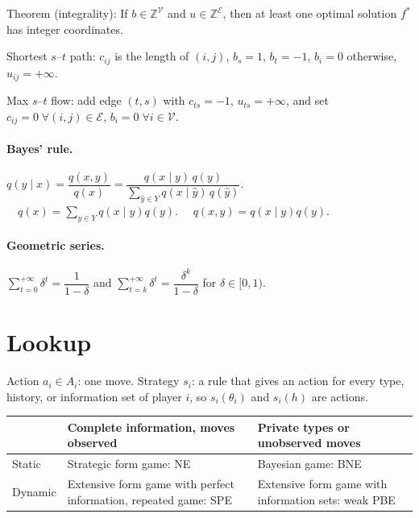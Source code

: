 \documentclass{article}
\begin{document}
Theorem (integrality): If $b\in\mathbb Z^{\mathcal V}$ and $u\in\mathbb Z^{\mathcal E}$, then at least one optimal solution $f^*$ has integer coordinates.

Shortest $s$--$t$ path: $c_{ij}$ is the length of $(i,j)$, $b_s=1$, $b_t=-1$, $b_i=0$ otherwise, $u_{ij}=+\infty$.

Max $s$--$t$ flow: add edge $(t,s)$ with $c_{ts}=-1$, $u_{ts}=+\infty$, and set $c_{ij}=0\;\forall(i,j)\in\mathcal E$, $b_i=0\;\forall i\in\mathcal V$.

\paragraph{Bayes' rule.}
$q(y\mid x)=\dfrac{q(x,y)}{q(x)} = \dfrac{q(x\mid y)\,q(y)}{\sum_{\hat y\in Y} q(x\mid \hat y)\,q(\hat y)}$.
$\quad q(x) = \sum_{y\in Y}q(x\mid y)q(y)$. 
$\quad q(x,y) = q(x\mid y)q(y)$. 

\paragraph{Geometric series.}
$\sum_{t=0}^{+\infty}\delta^{t}=\dfrac{1}{1-\delta}$ and $\sum_{t=k}^{+\infty}\delta^{t}=\dfrac{\delta^{k}}{1-\delta}$ for $\delta\in[0,1)$.

\section{Lookup}

Action $a_i\in A_i$: one move.
Strategy $s_i$: a rule that gives an action for every type, history, or information set of player $i$, so $s_i(\theta_i)$ and $s_i(h)$ are actions.

\begin{center}
\begin{tabular}{@{}p{18mm}>{\raggedright\arraybackslash}p{74mm}>{\raggedright\arraybackslash}p{74mm}@{}}
\toprule
 & Complete information, moves observed & Private types or unobserved moves \\
\midrule
Static & Strategic form game: NE & Bayesian game: BNE \\
Dynamic & Extensive form game with perfect information, repeated game: SPE & Extensive form game with information sets: weak PBE \\
\bottomrule
\end{tabular}
\end{center}
\end{document}
